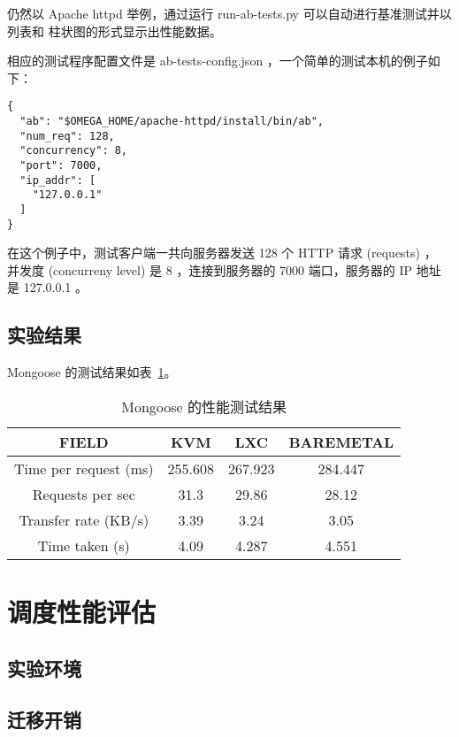 仍然以 Apache httpd 举例，通过运行 run-ab-tests.py 可以自动进行基准测试并以列表和
柱状图的形式显示出性能数据。

相应的测试程序配置文件是 ab-tests-config.json ，一个简单的测试本机的例子如下：

\begin{lstlisting}
{
  "ab": "$OMEGA_HOME/apache-httpd/install/bin/ab",
  "num_req": 128,
  "concurrency": 8,
  "port": 7000,
  "ip_addr": [
    "127.0.0.1"
  ]
}
\end{lstlisting}

在这个例子中，测试客户端一共向服务器发送 128 个 HTTP 请求 (requests) ，
并发度 (concurreny level) 是 8 ，连接到服务器的 7000 端口，服务器的 IP 地址是
127.0.0.1 。

\subsection{实验结果}

Mongoose 的测试结果如表~\ref{tab:mongoose-perf}。

\begin{table}[h]
    \centering
    \caption{Mongoose 的性能测试结果}
    \begin{tabular}{||c c c c||}
        \hline
        FIELD & KVM & LXC & BAREMETAL \\
        \hline
        \hline
        Time per request (ms) & 255.608 & 267.923 & 284.447 \\
        \hline
        Requests per sec & 31.3 & 29.86 & 28.12 \\
        \hline
        Transfer rate (KB/s) & 3.39 & 3.24 & 3.05 \\
        \hline
        Time taken (s) & 4.09 & 4.287 & 4.551 \\
        \hline
    \end{tabular}
    \label{tab:mongoose-perf}
\end{table}

\section{调度性能评估}

\subsection{实验环境}

\subsection{迁移开销}
